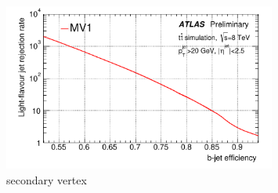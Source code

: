 \begin{figure}
	\includegraphics[width=0.8\textwidth]{ReconstructionPerformance/images/mv1_roc.pdf}
	\caption{secondary vertex \cite{b-tagging}	\label{fig:mv1_roc}  }
\end{figure}
















